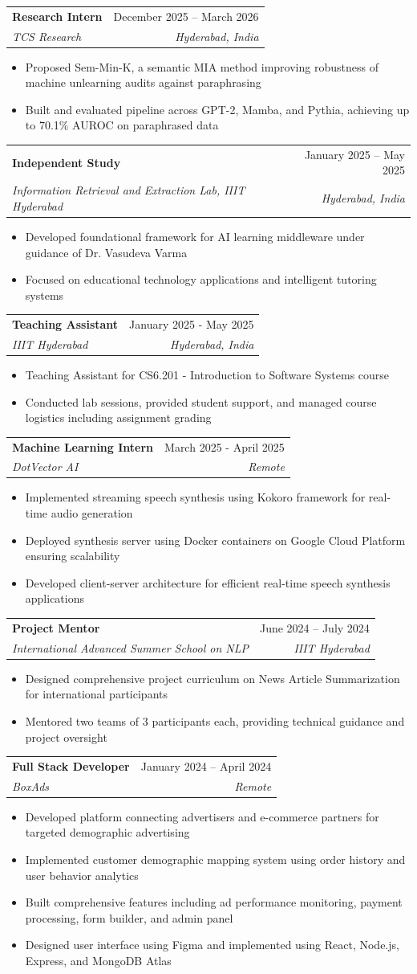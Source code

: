 \documentclass[letterpaper,11pt]{article}
\makeatletter
\newcommand{\resumeItem}[1]{
  \item\small{
    {#1 \vspace{-2pt}}
  }
}
\newcommand{\resumeSubheading}[4]{
  \vspace{-2pt}\item
    \begin{tabular*}{0.97\textwidth}[t]{l@{\extracolsep{\fill}}r}
      \textbf{#1} & #2 \\
      \textit{\small#3} & \textit{\small #4} \\
    \end{tabular*}\vspace{-7pt}
}
\newcommand{\resumeItemListStart}{\begin{itemize}}
\newcommand{\resumeItemListEnd}{\end{itemize}\vspace{-5pt}}
\makeatother
\begin{document}
\resumeSubheading
{Research Intern}{December 2025 -- March 2026}
{TCS Research}{Hyderabad, India}
\resumeItemListStart
\resumeItem{Proposed Sem-Min-K, a semantic MIA method improving robustness of machine unlearning audits against paraphrasing}
\resumeItem{Built and evaluated pipeline across GPT-2, Mamba, and Pythia, achieving up to 70.1\% AUROC on paraphrased data}
\resumeItemListEnd

\resumeSubheading
{Independent Study}{January 2025 -- May 2025}
{Information Retrieval and Extraction Lab, IIIT Hyderabad}{Hyderabad, India}
\resumeItemListStart
\resumeItem{Developed foundational framework for AI learning middleware under guidance of Dr. Vasudeva Varma}
\resumeItem{Focused on educational technology applications and intelligent tutoring systems}
\resumeItemListEnd

\resumeSubheading
{Teaching Assistant}{January 2025 - May 2025}
{IIIT Hyderabad}{Hyderabad, India}
\resumeItemListStart
\resumeItem{Teaching Assistant for CS6.201 - Introduction to Software Systems course}
\resumeItem{Conducted lab sessions, provided student support, and managed course logistics including assignment grading}
\resumeItemListEnd

\resumeSubheading
{Machine Learning Intern}{March 2025 - April 2025}
{DotVector AI}{Remote}
\resumeItemListStart
\resumeItem{Implemented streaming speech synthesis using Kokoro framework for real-time audio generation}
\resumeItem{Deployed synthesis server using Docker containers on Google Cloud Platform ensuring scalability}
\resumeItem{Developed client-server architecture for efficient real-time speech synthesis applications}
\resumeItemListEnd

\resumeSubheading
{Project Mentor}{June 2024 -- July 2024}
{International Advanced Summer School on NLP}{IIIT Hyderabad}
\resumeItemListStart
\resumeItem{Designed comprehensive project curriculum on News Article Summarization for international participants}
\resumeItem{Mentored two teams of 3 participants each, providing technical guidance and project oversight}
\resumeItemListEnd

\resumeSubheading
{Full Stack Developer}{January 2024 -- April 2024}
{BoxAds}{Remote}
\resumeItemListStart
\resumeItem{Developed platform connecting advertisers and e-commerce partners for targeted demographic advertising}
\resumeItem{Implemented customer demographic mapping system using order history and user behavior analytics}
\resumeItem{Built comprehensive features including ad performance monitoring, payment processing, form builder, and admin panel}
\resumeItem{Designed user interface using Figma and implemented using React, Node.js, Express, and MongoDB Atlas}
\resumeItemListEnd
\end{document}

